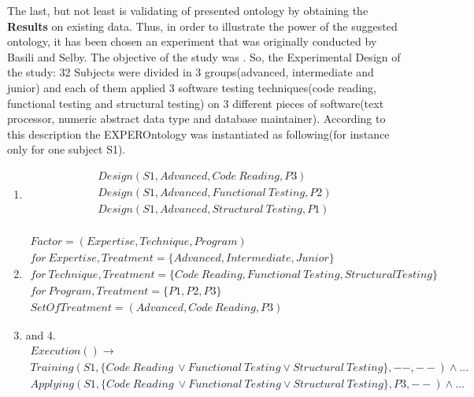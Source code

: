	The last, but not least is validating of presented ontology by obtaining the \textbf{Results} on existing data. Thus, in order to illustrate the power of the suggested ontology, it has been chosen an experiment that was originally conducted by Basili and Selby\cite{Bas87}. The objective of the study was \frqq\cite[abstract]{Bas87}. So, the Experimental Design of the study: 32 Subjects were divided in 3 groups(advanced, intermediate and junior) and  each of them applied 3 software testing techniques(code reading, functional testing and structural testing) on 3 different pieces of software(text processor, numeric abstract data type and database maintainer). According to this description the EXPEROntology was instantiated as following(for instance only for one subject S1).
	\begin{enumerate}
		\item \begin{align*}
			Design(S1, Advanced, Code\ Reading, P3) \\
			Design(S1, Advanced, Functional\ Testing, P2) \\
			Design(S1, Advanced, Structural\ Testing, P1) \\
		\end{align*}
		\item \begin{align*}
			Factor = (Expertise, Technique, Program) \\
			for\ Expertise, Treatment = \{Advanced, Intermediate, Junior\} \\
			for\ Technique, Treatment = \{Code\ Reading, Functional\ Testing, Structural Testing\} \\
			for\ Program, Treatment = \{P1,P2,P3\} \\
			SetOfTreatment = {(Advanced, Code\ Reading, P3)}
		\end{align*}
		\item and 4.  
		\begin{align*}
			Execution() \rightarrow  \\
			Training(S1, \{Code\ Reading\ \lor Functional\ Testing \lor  Structural\ Testing\}, --, --) \land ... \\
			Applying(S1,\{Code\ Reading\ \lor Functional\ Testing \lor  Structural\ Testing\}, P3, --) \land ... \\
		\end{align*}
	\end{enumerate}
  
